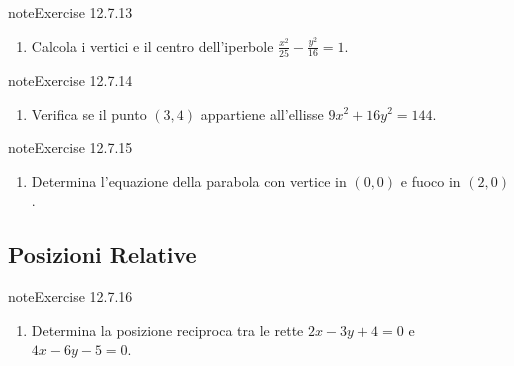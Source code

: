 \documentclass[letterpaper,10pt,italian]{jupyterBook}
\begin{document}
\begin{sphinxadmonition}{note}{Exercise 12.7.13}


\begin{enumerate}
%
\setcounter{enumi}{12}
\item {} 
\sphinxAtStartPar
Calcola i vertici e il centro dell’iperbole \( \frac{x^2}{25} - \frac{y^2}{16} = 1 \).

\end{enumerate}
\end{sphinxadmonition}
 \label{exercise:ch/analytic_geometry/analytic_geometry_2d/problems-exercise-13}

\begin{sphinxadmonition}{note}{Exercise 12.7.14}


\begin{enumerate}
%
\setcounter{enumi}{13}
\item {} 
\sphinxAtStartPar
Verifica se il punto \( (3, 4) \) appartiene all’ellisse \( 9x^2 + 16y^2 = 144 \).

\end{enumerate}
\end{sphinxadmonition}
 \label{exercise:ch/analytic_geometry/analytic_geometry_2d/problems-exercise-14}

\begin{sphinxadmonition}{note}{Exercise 12.7.15}


\begin{enumerate}
%
\setcounter{enumi}{14}
\item {} 
\sphinxAtStartPar
Determina l’equazione della parabola con vertice in \( (0, 0) \) e fuoco in \( (2, 0) \).

\end{enumerate}
\end{sphinxadmonition}


\subsection{Posizioni Relative}
\label{\detokenize{ch/analytic_geometry/analytic_geometry_2d/problems:posizioni-relative}} \label{exercise:ch/analytic_geometry/analytic_geometry_2d/problems-exercise-15}

\begin{sphinxadmonition}{note}{Exercise 12.7.16}


\begin{enumerate}
%
\setcounter{enumi}{15}
\item {} 
\sphinxAtStartPar
Determina la posizione reciproca tra le rette \( 2x - 3y + 4 = 0 \) e \( 4x - 6y - 5 = 0 \).

\end{enumerate}
\end{sphinxadmonition}
 \label{exercise:ch/analytic_geometry/analytic_geometry_2d/problems-exercise-16}
\end{document}
